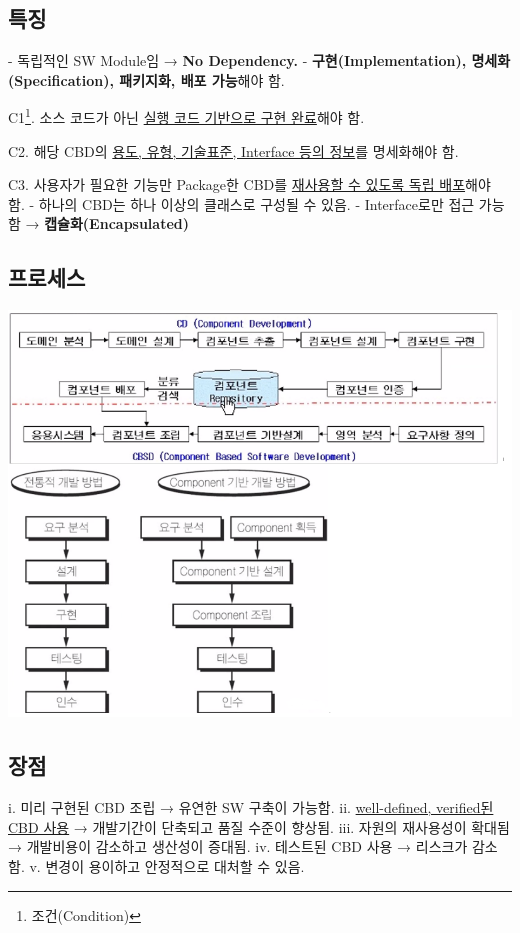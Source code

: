 \documentclass[a4paper,12pt]{article}
\begin{document}
\subsection{특징}
- 독립적인 SW Module임 → \textbf{No Dependency.}
\newline
- \textbf{구현(Implementation), 명세화(Specification), 패키지화, 배포 가능}해야 함.

C1\footnote{조건(Condition)}. 소스 코드가 아닌 \underline{실행 코드 기반으로 구현 완료}해야 함.

C2. 해당 CBD의 \underline{용도, 유형, 기술표준, Interface 등의 정보}를 명세화해야 함.

C3. 사용자가 필요한 기능만 Package한 CBD를 \underline{재사용할 수 있도록 독립 배포}해야 함.
\newline
- 하나의 CBD는 하나 이상의 클래스로 구성될 수 있음.
\newline
- Interface로만 접근 가능함 → \textbf{캡슐화(Encapsulated)}
\newline

\subsection{프로세스}

\includegraphics[scale=0.65]{57}
\newline

\subsection{장점}
i. 미리 구현된 CBD 조립 → 유연한 SW 구축이 가능함.
\newline
ii. \underline{well-defined, verified된 CBD 사용} → 개발기간이 단축되고 품질 수준이 향상됨.
\newline
iii. 자원의 재사용성이 확대됨 → 개발비용이 감소하고 생산성이 증대됨.
\newline
iv. 테스트된 CBD 사용 → 리스크가 감소함.
\newline
v. 변경이 용이하고 안정적으로 대처할 수 있음.
\newline
\end{document}
